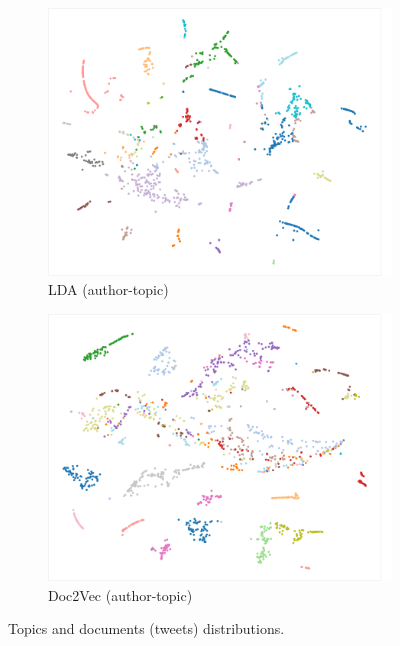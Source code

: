 \documentclass[11pt]{article}
\begin{document}
\begin{figure}[H]
    \begin{subfigure}{.49\linewidth}
    \includegraphics[width=\linewidth]{lda_grp}
    \caption{LDA (author-topic)}\label{fig:res_lda_grp}
    \end{subfigure}
    \begin{subfigure}{.49\linewidth}
    \includegraphics[width=\linewidth]{doc_grp}
    \caption{Doc2Vec (author-topic)}\label{fig:res_doc_grp}
    \end{subfigure}
    
    \caption{Topics and documents (tweets) distributions.}
    \label{fig:res_distribution}
\end{figure}
\end{document}
